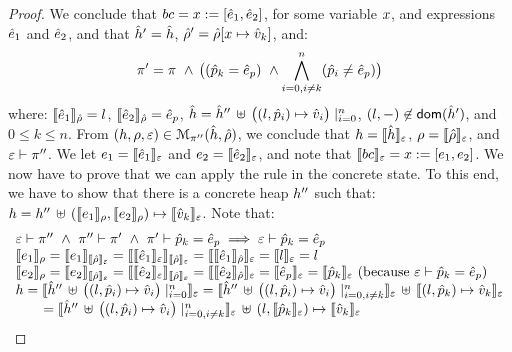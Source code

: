 \begin{proof}
\noindent{}
We conclude that $\bcmd = \jvar := [\sexpr_1, \sexpr_2]$, for some variable $\jvar$, and expressions $\sexpr_1$ and $\sexpr_2$, 
and that $\sheap' = \sheap$, $\sstore' = \sstore[\jvar \mapsto \sexprv_k]$, and: 
 $$\pc' =  \pc \ \wedge \, \big( (\sexprp_k = \sexpr_p) \ \wedge \bigwedge_{i = 0, i \neq k}^n (\sexprp_i \neq \sexpr_p) \big)$$
 where:
 $\symbeval{\sexpr_1}{\sstore} =  \loc$, $\symbeval{\sexpr_2}{\sstore} =  \sexpr_p$, 
 $\sheap = \sheap'' \, \uplus \, \big((l, \sexprp_i) \mapsto \sexprv_i\big)\mid_{i = 0}^n$, 
 $(l, -) \not\in \domain(\sheap')$, and $0 \leq k \leq n$. 
%
From $(\heap, \store, \senv) \in \smodels{\sheap, \sstore}{\pc''}$, we conclude that $\heap = \semexpr{\sheap}{\senv}$, $\store = \semexpr{\sstore}{\senv}$, and 
$\senv \vdash \pc''$. 
We let $\jsilexpr_1 = \symbeval{\sexpr_1}{\senv}$ and $\jsilexpr_2 = \symbeval{\sexpr_2}{\senv}$, and note that $\symbeval{\bcmd}{\senv} = \jvar := [\jsilexpr_1, \jsilexpr_2]$.
We now have to prove that we can apply the  rule in the concrete state.
To this end, we have to show that there is a concrete heap $\heap''$ such that:
$\heap = \heap'' \dunion \hcell{\symbeval{\jsilexpr_1}{\store}}{\symbeval{\jsilexpr_2}{\store}}{\symbeval{\sexprv_k}{\senv}}$. 
Note that: 
$$
\begin{array}{l}
%
\senv \vdash \pc'' \ \wedge \ \pc'' \vdash \pc' \ \wedge \ \pc' \vdash \sexprp_k = \sexpr_p \implies \senv \vdash \sexprp_k = \sexpr_p \\
%
 \symbeval{\jsilexpr_1}{\store} = \symbeval{\jsilexpr_1}{\symbeval{\sstore}{\senv}} = \symbeval{\symbeval{\sexpr_1}{\senv}}{\symbeval{\sstore}{\senv}} = \symbeval{\symbeval{\sexpr_1}{\sstore}}{\senv} 
    = \symbeval{\loc}{\senv} = \loc \\ 
  \symbeval{\jsilexpr_2}{\store}  = \symbeval{\jsilexpr_2}{\semexpr{\sstore}{\senv}} =  \symbeval{\symbeval{\sexpr_2}{\senv}}{\symbeval{\sstore}{\senv}} = \symbeval{\symbeval{\sexpr_2}{\sstore}}{\senv}
   =  \symbeval{\sexpr_p}{\senv} = \symbeval{\sexprp_k}{\senv}  \text{ (because $\senv \vdash \sexprp_k = \sexpr_p$)} \\
 \heap = \semexpr{\sheap'' \, \uplus \, \big((l, \sexprp_i) \mapsto \sexprv_i\big)\mid_{i = 0}^n}{\senv} 
       =  \semexpr{\sheap'' \, \uplus \, \big((l, \sexprp_i) \mapsto \sexprv_i\big)\mid_{i = 0, i \neq k}^n}{\senv} \dunion \semexpr{(l, \sexprp_k) \mapsto \sexprv_k}{\senv} \\
         \qquad = \semexpr{\sheap'' \, \uplus \, \big((l, \sexprp_i) \mapsto \sexprv_i\big)\mid_{i = 0, i \neq k}^n}{\senv} \dunion (l, \semexpr{\sexprp_k}{\senv}) \mapsto \semexpr{\sexprv_k}{\senv}  \\ 

\end{array}$$
\end{proof}
